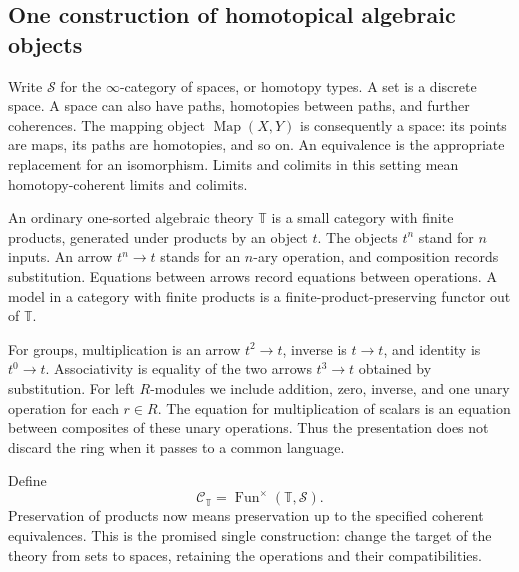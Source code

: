 \documentclass[11pt]{article}
\theoremstyle{definition}
\theoremstyle{remark}\newtheorem{remark}[theorem]{Remark}
\begin{document}
\subsection{One construction of homotopical algebraic objects}

Write $\mathcal S$ for the $\infty$-category of spaces, or homotopy types.
A set is a discrete space.  A space can also have paths, homotopies between
paths, and further coherences.  The mapping object
$\operatorname{Map}(X,Y)$ is consequently a space: its points are maps,
its paths are homotopies, and so on.  An equivalence is the appropriate
replacement for an isomorphism.  Limits and colimits in this setting mean
homotopy-coherent limits and colimits.

An ordinary one-sorted algebraic theory $\mathbb T$ is a small category
with finite products, generated under products by an object $t$.
The objects $t^n$ stand for $n$ inputs.  An arrow $t^n\to t$ stands for
an $n$-ary operation, and composition records substitution.  Equations
between arrows record equations between operations.  A model in a category
with finite products is a finite-product-preserving functor out of
$\mathbb T$.

For groups, multiplication is an arrow $t^2\to t$, inverse is $t\to t$,
and identity is $t^0\to t$.  Associativity is equality of the two arrows
$t^3\to t$ obtained by substitution.  For left $R$-modules we include
addition, zero, inverse, and one unary operation for each $r\in R$.
The equation for multiplication of scalars is an equation between
composites of these unary operations.  Thus the presentation does not
discard the ring when it passes to a common language.

Define
\begin{equation}\label{h:theory-models}
 \mathcal C_{\mathbb T}
   =\operatorname{Fun}^{\times}(\mathbb T,\mathcal S).
\end{equation}
Preservation of products now means preservation up to the specified coherent
equivalences.  This is the promised single construction: change the target
of the theory from sets to spaces, retaining the operations and their
compatibilities.
\end{document}
